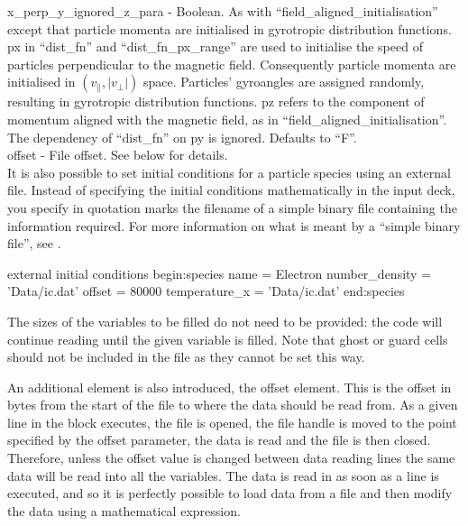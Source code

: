 {\emphtext x\_perp\_y\_ignored\_z\_para} -
Boolean. As with ``field\_aligned\_initialisation'' except that particle momenta
are initialised in gyrotropic distribution functions. px in ``dist\_fn'' and
``dist\_fn\_px\_range'' are used to initialise the speed of particles
perpendicular to the magnetic field. Consequently particle momenta are
initialised in $(v_\parallel, |v_\bot|)$ space.
Particles' gyroangles are assigned randomly, resulting in gyrotropic
distribution functions.
pz refers to the component of momentum aligned with the magnetic field, as
in ``field\_aligned\_initialisation''.
The dependency of ``dist\_fn'' on py is ignored.
Defaults to ``F''.\\

{\emphtext offset} - File offset. See below for details.\\


It is also possible to set initial conditions for a particle species
using an external file.  Instead of specifying the
initial conditions mathematically in the input deck, you specify in quotation
marks the filename of a simple binary file containing the information required.
For more information on what is meant by a ``simple binary file'', see
.
\begin{lboxverbatim}{external initial conditions}
begin:species
   name = Electron
   number_density = 'Data/ic.dat'
   offset = 80000
   temperature_x = 'Data/ic.dat'
end:species
\end{lboxverbatim}

The sizes of the variables to be filled do not need to be provided: the
code will continue reading until the given variable is filled.
Note that ghost or guard cells should not be included in the file as
they cannot be set this way.

An additional element is also introduced, the offset element. This
is the offset in bytes from the start of the file to where the data should
be read from. As a given line in the block executes, the file is opened, the
file handle is moved to the point specified by the offset parameter, the data
is read and the file is then closed. Therefore, unless the offset value is
changed between data reading lines the same data will be read into all the
variables. The data is read in as soon as a line is executed, and so it is
perfectly possible to load data from a file and then modify the data using
a mathematical expression.\\

